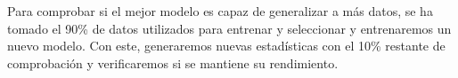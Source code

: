 \documentclass[10pt,a4paper,twoside]{article}
\begin{document}
\begin{multicols*}{2}
    \begin{table}[H]
        \begin{center}
        \end{center}
        \caption{Rendimiento de modelos sobre los datos de entrenamiento y selección}
        \label{table:rendimientomodelos}
    \end{table}

    Para comprobar si el mejor modelo es capaz de generalizar a más datos, se ha tomado el 90\% de datos utilizados para entrenar y seleccionar y entrenaremos un nuevo modelo. Con este, generaremos nuevas estadísticas con el 10\% restante de comprobación y verificaremos si se mantiene su rendimiento.


\end{multicols*}
\end{document}

